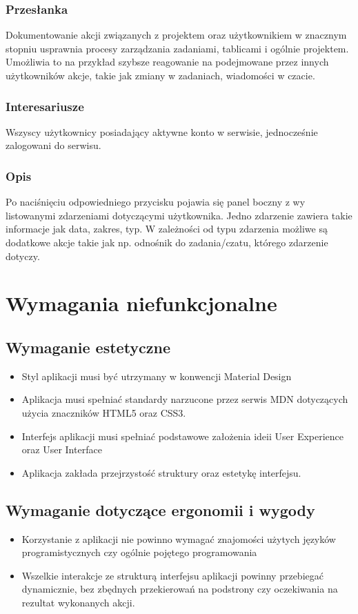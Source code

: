 \documentclass[eng,printmode]{mgr}
\begin{document}
\subsubsection{Przesłanka}
Dokumentowanie akcji związanych z projektem oraz użytkownikiem w znacznym stopniu usprawnia procesy zarządzania zadaniami, tablicami i ogólnie projektem. Umożliwia to na przykład szybsze reagowanie na podejmowane przez innych użytkowników akcje, takie jak zmiany w zadaniach, wiadomości w czacie.

\subsubsection{Interesariusze}
Wszyscy użytkownicy posiadający aktywne konto w serwisie, jednocześnie zalogowani do serwisu.

\subsubsection{Opis}
Po naciśnięciu odpowiedniego przycisku pojawia się panel boczny z wy listowanymi zdarzeniami dotyczącymi użytkownika. Jedno zdarzenie zawiera takie informacje jak data, zakres, typ. W zależności od typu zdarzenia możliwe są dodatkowe akcje takie jak np. odnośnik do zadania/czatu, którego zdarzenie dotyczy.

\section{Wymagania niefunkcjonalne}
\subsection{Wymaganie estetyczne}
\begin{itemize}
  \item Styl aplikacji musi być utrzymany w konwencji Material Design\cite{Material}
  \item Aplikacja musi spełniać standardy narzucone przez serwis MDN\cite{MDN_HTML}\cite{MDN_CSS} dotyczących użycia znaczników HTML5 oraz CSS3.
  \item Interfejs aplikacji musi spełniać podstawowe założenia ideii User Experience oraz User Interface\cite{Keyword_UserInterface}
  \item Aplikacja zakłada przejrzystość struktury oraz estetykę interfejsu.
\end{itemize} 

\subsection{Wymaganie dotyczące ergonomii i wygody}
\begin{itemize}
  \item Korzystanie z aplikacji nie powinno wymagać znajomości użytych języków programistycznych czy ogólnie pojętego programowania
  \item Wszelkie interakcje ze strukturą interfejsu aplikacji powinny przebiegać dynamicznie, bez zbędnych przekierowań na podstrony  czy oczekiwania na rezultat wykonanych akcji.
\end{itemize}
\end{document}
